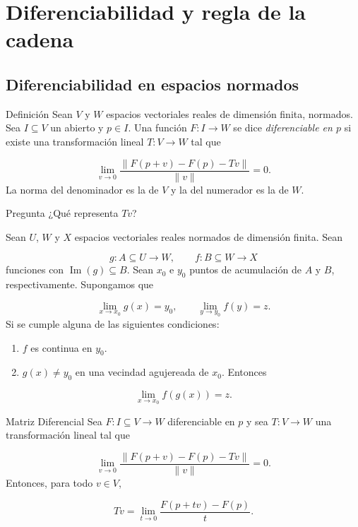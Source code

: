 \chapter{Diferenciabilidad y regla de la cadena}
\label{ch:teo-1}
\section{Diferenciabilidad en espacios normados}
\begin{bookdefinition}{Definición}
Sean $V$ y $W$ espacios vectoriales reales de dimensión finita, normados. Sea $I \subseteq V$ un abierto y $p \in I$. Una función $F \colon I \to W$ se dice \emph{diferenciable en $p$} si existe una transformación lineal $T \colon V \to W$ tal que

\[
\lim_{v \to 0} \frac{\|F(p+v)-F(p)-Tv\|}{\|v\|} = 0.
\]
La norma del denominador es la de $V$ y la del numerador es la de $W$.

\end{bookdefinition}
\begin{bookremark}{Pregunta}
¿Qué representa $Tv$?

\end{bookremark}
\begin{booklemma}{}
Sean $U$, $W$ y $X$ espacios vectoriales reales normados de dimensión finita. Sean

\[
g \colon A \subseteq U \to W,\qquad f \colon B \subseteq W \to X
\]
funciones con $\operatorname{Im}(g)\subseteq B$. Sean $x_0$ e $y_0$ puntos de acumulación de $A$ y $B$, respectivamente. Supongamos que

\[
\lim_{x\to x_0} g(x)=y_0, \qquad \lim_{y\to y_0} f(y)=z.
\]
Si se cumple alguna de las siguientes condiciones:

\begin{enumerate}
\item $f$ es continua en $y_0$.
\item $g(x)\neq y_0$ en una vecindad agujereada de $x_0$. Entonces
\end{enumerate}
\[
\lim_{x\to x_0} f(g(x))=z.
\]
\end{booklemma}
\begin{bookproposition}{Matriz Diferencial}
Sea $F \colon I \subseteq V \to W$ diferenciable en $p$ y sea $T \colon V \to W$ una transformación lineal tal que

\[
\lim_{v \to 0} \frac{\|F(p+v)-F(p)-Tv\|}{\|v\|} = 0.
\]
Entonces, para todo $v \in V$,

\[
Tv = \lim_{t \to 0} \frac{F(p+tv)-F(p)}{t}.
\]
\end{bookproposition}
